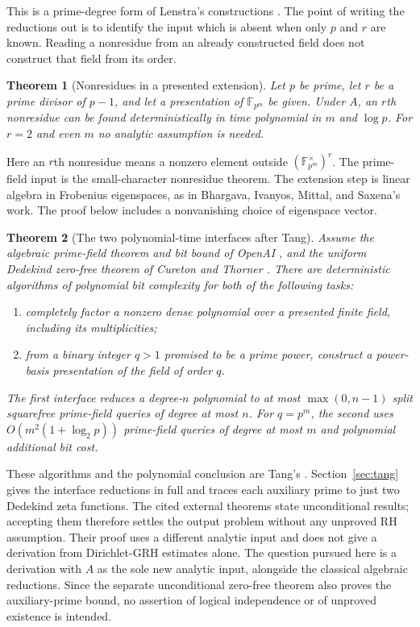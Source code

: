 \documentclass[11pt]{article}
\newcommand{\F}{\mathbb F}
\newtheorem{theorem}{Theorem}[section]
\theoremstyle{definition}
\theoremstyle{remark}
\begin{document}
This is a prime-degree form of Lenstra's constructions
\citep[Theorems~(3.1), (5.1), and (5.2), pp.~334--340]{Lenstra1991}.
The point of writing the reductions out is to identify the input which
is absent when only $p$ and $r$ are known.  Reading a nonresidue from an
already constructed field does not construct that field from its order.

\begin{theorem}[Nonresidues in a presented extension]
\label{thm:nonresidue}
Let $p$ be prime, let $r$ be a prime divisor of $p-1$, and let a
presentation of $\F_{p^m}$ be given.  Under $A$, an $r$th nonresidue
can be found deterministically in time polynomial in $m$ and $\log p$.
For $r=2$ and even $m$ no analytic assumption is needed.
\end{theorem}

Here an $r$th nonresidue means a nonzero element outside
$(\F_{p^m}^{\times})^r$.  The prime-field input is the small-character
nonresidue theorem.  The extension step is linear algebra in Frobenius
eigenspaces, as in Bhargava, Ivanyos, Mittal, and Saxena's work.
The proof below includes a nonvanishing choice of eigenspace vector.

\begin{theorem}[The two polynomial-time interfaces after Tang]
\label{thm:tangfront}
Assume the algebraic prime-field theorem and bit bound of OpenAI
\citep[Theorem~1.2, p.~3; Proposition~10.1, pp.~41--44]{OpenAI2026},
and the uniform Dedekind zero-free theorem of Cureton and Thorner
\citep[Theorem~1.1, p.~3]{CT2026}.
There are deterministic algorithms of polynomial bit complexity for
both of the following tasks:
\begin{enumerate}
\item completely factor a nonzero dense polynomial over a presented
finite field, including its multiplicities;
\item from a binary integer $q>1$ promised to be a prime power,
construct a power-basis presentation of the field of order $q$.
\end{enumerate}
The first interface reduces a degree-$n$ polynomial to at most
$\max(0,n-1)$ split squarefree prime-field queries of degree at most $n$.
For $q=p^m$, the second uses $O(m^2(1+\log_2p))$ prime-field
queries of degree at most $m$ and polynomial additional bit cost.
\end{theorem}

These algorithms and the polynomial conclusion are Tang's
\citep[Theorem~1.1 and Propositions~3.1, 4.1, pp.~2, 4--7]{Tang2026}.
Section~\ref{sec:tang} gives the interface reductions in full and
traces each auxiliary prime to just two Dedekind zeta functions.
The cited external theorems state unconditional results; accepting
them therefore settles the output problem without any unproved RH
assumption. Their proof uses a different analytic input and does not give
a derivation from Dirichlet-GRH estimates alone.  The question pursued
here is a derivation with $A$ as the sole new analytic input, alongside
the classical algebraic reductions.  Since the separate unconditional
zero-free theorem also proves the auxiliary-prime bound, no assertion
of logical independence or of unproved existence is intended.
\end{document}
